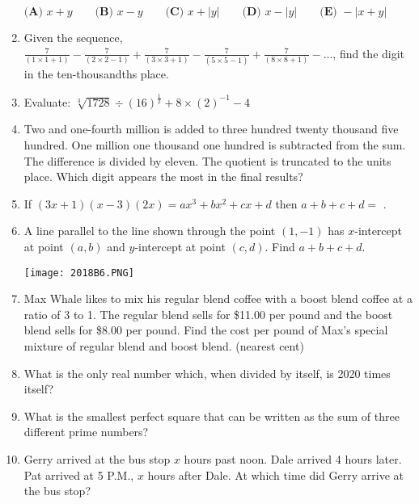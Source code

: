\documentclass[../uilmath.tex]{subfiles}
\begin{document}
\begin{enumerate}[label=\bfseries\arabic*.]
        $\textbf{(A) } x+y \qquad \textbf{(B) } x-y \qquad \textbf{(C) } x+|y| \qquad \textbf{(D) } x-|y| \qquad \textbf{(E) } -|x+y|$

        \item %
        Given the sequence, $\frac{7}{(1\times 1+1)}-\frac{7}{(2\times 2-1)}+\frac{7}{(3\times 3+1)}-\frac{7}{(5\times 5-1)}+\frac{7}{(8\times 8+1)}-\dots$, find the digit 
        in the ten-thousandths place. 

        \item %
        Evaluate: $\sqrt[3]{1728}\div (16)^{\frac{1}{2}}+8\times (2)^{-1}-4$

        \item %
        Two and one-fourth million is added to three hundred twenty thousand five hundred. One million one thousand one hundred is subtracted from the sum. The difference is divided by 
        eleven. The quotient is truncated to the units place. Which digit appears the most in the final results?

        \item %
        If $(3x+1)(x-3)(2x)=ax^3+bx^2+cx+d$ then $a+b+c+d=$ \blank . 

        \item %
        A line parallel to the line shown through the point $(1,-1)$ has $x$-intercept at point $(a,b)$ and $y$-intercept at point $(c,d)$. Find $a+b+c+d$.
        \begin{center}
            \texttt{[image: 2018B6.PNG]}
        \end{center}

        \item %
        Max Whale likes to mix his regular blend coffee with a boost blend coffee at a ratio of 3 to 1. The regular blend sells for \$11.00 per pound and the boost blend sells for \$8.00 per pound.
        Find the cost per pound of Max's special mixture of regular blend and boost blend. (nearest cent)

        \item %
        What is the only real number which, when divided by itself, is 2020 times itself?

        \item %
        What is the smallest perfect square that can be written as the sum of three different prime numbers?

        \item %
        Gerry arrived at the bus stop $x$ hours past noon. Dale arrived 4 hours later. Pat arrived at 5 P.M., $x$ hours after Dale. At which time did 
        Gerry arrive at the bus stop? 


\end{enumerate}
\end{document}
